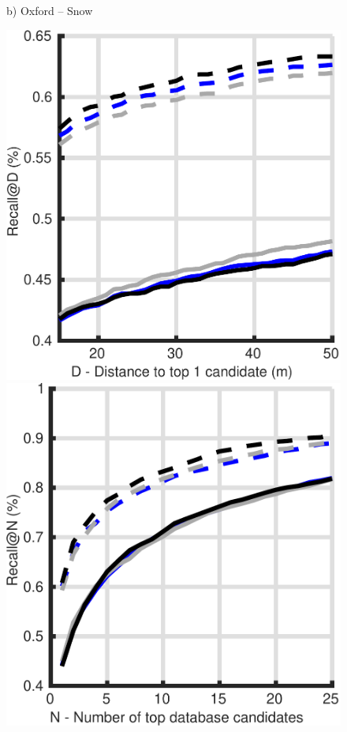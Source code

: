 \begin{figure}
\begin{minipage}{0.19\linewidth}
		b) Oxford -- Snow
	\end{minipage}
	\begin{minipage}{0.19\linewidth}
		\center \scriptsize
		\includegraphics[width=\linewidth]{plot/depth_vs_ref/Results_cmu_lt/distance}	
		
		\includegraphics[width=\linewidth]{plot/depth_vs_ref/Results_cmu_lt/recall}
		

\end{minipage}
\end{figure}
